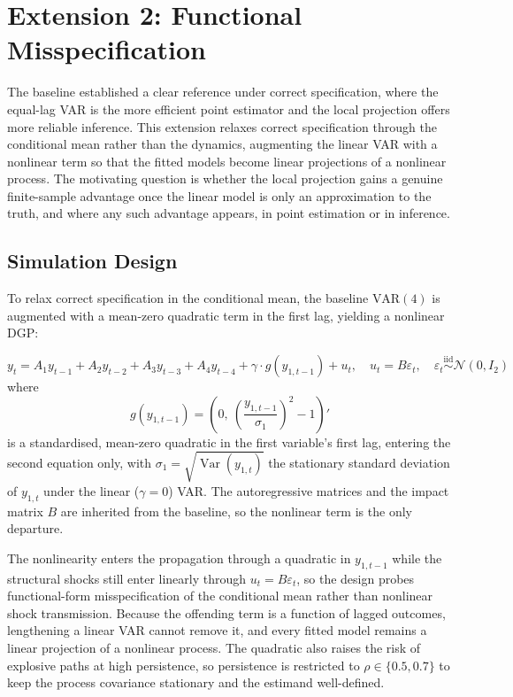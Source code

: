 

\section{Extension 2: Functional Misspecification}
The baseline established a clear reference under correct specification, where the equal-lag VAR is
the more efficient point estimator and the local projection offers more reliable inference. This
extension relaxes correct specification through the conditional mean rather than the dynamics,
augmenting the linear VAR with a nonlinear term so that the fitted models become linear
projections of a nonlinear process. The motivating question is whether the local projection gains
a genuine finite-sample advantage once the linear model is only an approximation to the truth, and
where any such advantage appears, in point estimation or in inference.


\subsection{Simulation Design}
To relax correct specification in the conditional mean, the baseline $\text{VAR}(4)$ is augmented
with a mean-zero quadratic term in the first lag, yielding a nonlinear DGP:

\begin{equation}
    y_t = A_1 y_{t-1} + A_2 y_{t-2} + A_3 y_{t-3} + A_4 y_{t-4}
    + \gamma \cdot g(y_{1,t-1}) + u_t, \quad u_t = B\varepsilon_t,
    \quad \varepsilon_t \overset{\text{iid}}{\sim} \mathcal{N}(0, I_2)
\end{equation}
where
\begin{equation}
    g(y_{1,t-1}) = \left(0,\ \left(\frac{y_{1,t-1}}{\sigma_1}\right)^{\!2} - 1\right)'
\end{equation}
is a standardised, mean-zero quadratic in the first variable's first lag, entering the second
equation only, with $\sigma_1 = \sqrt{\operatorname{Var}(y_{1,t})}$ the stationary standard
deviation of $y_{1,t}$ under the linear ($\gamma=0$) VAR. The autoregressive matrices and the
impact matrix $B$ are inherited from the baseline, so the nonlinear term is the only departure.

The nonlinearity enters the propagation through a quadratic in $y_{1,t-1}$ while the structural
shocks still enter linearly through $u_t = B\varepsilon_t$, so the design probes functional-form
misspecification of the conditional mean rather than nonlinear shock transmission. Because the
offending term is a function of lagged outcomes, lengthening a linear VAR cannot remove it, and
every fitted model remains a linear projection of a nonlinear process. The quadratic also raises
the risk of explosive paths at high persistence, so persistence is restricted to
$\rho \in \{0.5, 0.7\}$ to keep the process covariance stationary and the estimand well-defined.

